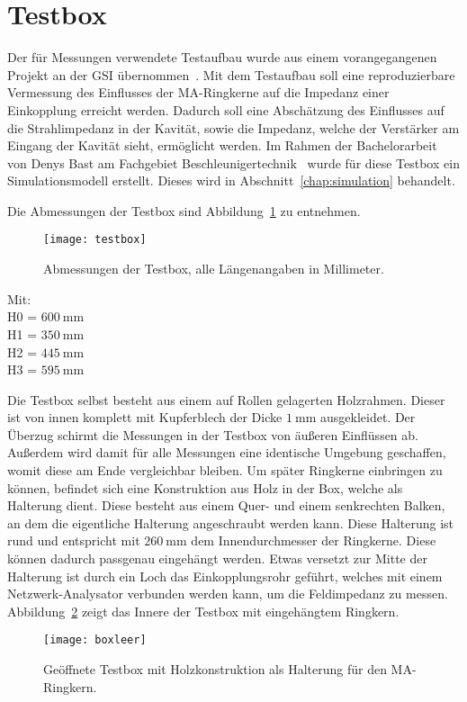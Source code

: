 \section{Testbox}
\label{sec:testbox}
Der f\"ur Messungen verwendete Testaufbau wurde aus einem vorangegangenen Projekt an der GSI \"ubernommen~\citep{harzheim2016modeling}. Mit dem Testaufbau soll eine reproduzierbare Vermessung des Einflusses der MA-Ringkerne auf die Impedanz einer Einkopplung erreicht werden. Dadurch soll eine Absch\"atzung des Einflusses auf die Strahlimpedanz in der Kavit\"at, sowie die Impedanz, welche der Verst\"arker am Eingang der Kavit\"at sieht, erm\"oglicht werden. Im Rahmen der Bachelorarbeit von Denys Bast am Fachgebiet Beschleunigertechnik~\citep{bast2017ba} wurde f\"ur diese Testbox ein Simulationsmodell erstellt. Dieses wird in Abschnitt~\ref{chap:simulation} behandelt.

\par
Die Abmessungen der Testbox sind Abbildung~\ref{fig:boxdimensions} zu entnehmen.
\par
\begin{figure}[htb]
	\centering
	\texttt{[image: testbox]}
	\caption{Abmessungen der Testbox, alle L\"angenangaben in Millimeter.}
	\label{fig:boxdimensions}
\end{figure}
Mit:\\
H0 = $\SI{600}{\milli\meter}$\\
H1 = $\SI{350}{\milli\meter}$\\
H2 = $\SI{445}{\milli\meter}$\\
H3 = $\SI{595}{\milli\meter}$

Die Testbox selbst besteht aus einem auf Rollen gelagerten Holzrahmen. Dieser ist von innen komplett mit Kupferblech der Dicke $\SI{1}{\milli\meter}$ ausgekleidet. Der Überzug schirmt die Messungen in der Testbox von \"au\ss{}eren Einfl\"ussen ab. Au\ss{}erdem wird damit f\"ur alle Messungen eine identische Umgebung geschaffen, womit diese am Ende vergleichbar bleiben. Um sp\"ater Ringkerne einbringen zu k\"onnen, befindet sich eine Konstruktion aus Holz in der Box, welche als Halterung dient. Diese besteht aus einem Quer- und einem senkrechten Balken, an dem die eigentliche Halterung angeschraubt werden kann. Diese Halterung ist rund und entspricht mit $\SI{260}{\milli\meter}$ dem Innendurchmesser der Ringkerne. Diese k\"onnen dadurch passgenau eingeh\"angt werden. Etwas versetzt zur Mitte der Halterung ist durch ein Loch das Einkopplungsrohr gef\"uhrt, welches mit einem Netzwerk-Analysator verbunden werden kann, um die Feldimpedanz zu messen. Abbildung~\ref{fig:leereBox} zeigt das Innere der Testbox mit eingeh\"angtem Ringkern. 
\par
\begin{figure}[htb]
	\centering
	\texttt{[image: boxleer]}
	\caption{Ge\"offnete Testbox mit Holzkonstruktion als Halterung f\"ur den MA-Ringkern.}
	\label{fig:leereBox}
\end{figure}


